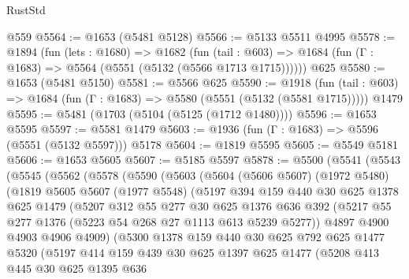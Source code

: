 \begin{lexlean}{RustStd}
\begin{coremodule}
    @559
@5564 := @1653 (@5481 @5128)
@5566 := @5133 @5511 @4995
@5578 := @1894
    (fun (lets : @1680) =>
    @1682
      (fun (tail : @603) => @1684 (fun (Γ : @1683) => @5564 (@5551 (@5132 (@5566 @1713 @1715))))))
    @625
@5580 := @1653 (@5481 @5150)
@5581 := @5566 @625
@5590 := @1918
    (fun (tail : @603) => @1684 (fun (Γ : @1683) => @5580 (@5551 (@5132 (@5581 @1715)))))
    @1479
@5595 := @5481 (@1703 (@5104 (@5125 (@1712 @1480))))
@5596 := @1653 @5595
@5597 := @5581 @1479
@5603 := @1936 (fun (Γ : @1683) => @5596 (@5551 (@5132 @5597))) @5178
@5604 := @1819 @5595
@5605 := @5549 @5181
@5606 := @1653 @5605
@5607 := @5185 @5597
@5878 := @5500
    (@5541
      (@5543
        (@5545
          (@5562
            (@5578
              (@5590
                (@5603
                  (@5604
                    (@5606 @5607)
                    (@1972 @5480)
                    (@1819
                      @5605
                      @5607
                      (@1977 @5548)
                      (@5197
                        @394
                        @159
                        @440
                        @30
                        @625
                        @1378
                        @625
                        @1479
                        (@5207
                          @312
                          @55
                          @277
                          @30
                          @625
                          @1376
                          @636
                          @392
                          (@5217 @55 @277 @1376 (@5223 @54 @268 @27 @1113 @613 @5239 @5277))
                          @4897
                          @4900
                          @4903
                          @4906
                          @4909)
                        (@5300
                          @1378
                          @159
                          @440
                          @30
                          @625
                          @792
                          @625
                          @1477
                          @5320
                          (@5197
                            @414
                            @159
                            @439
                            @30
                            @625
                            @1397
                            @625
                            @1477
                            (@5208
                              @413
                              @445
                              @30
                              @625
                              @1395
                              @636

\end{coremodule}
\end{lexlean}
